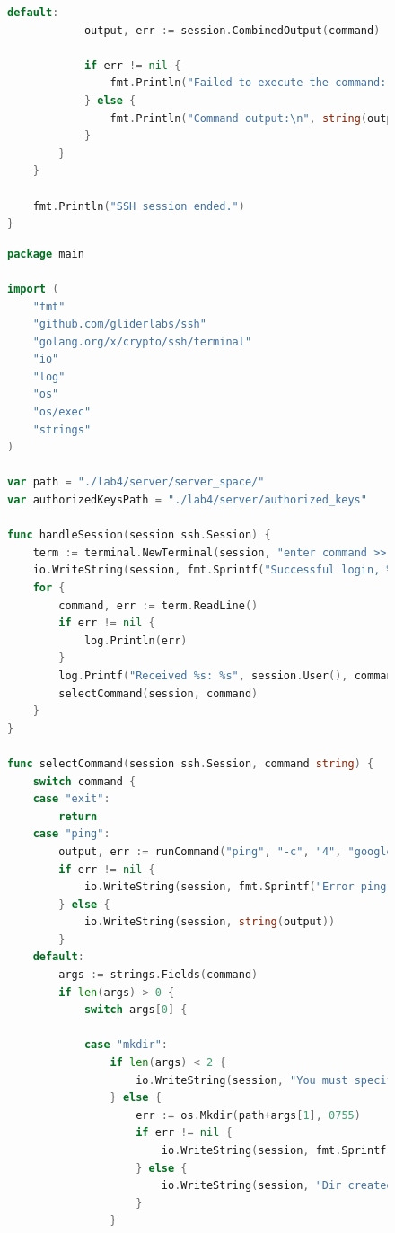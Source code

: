 \documentclass[a4paper, 14pt]{extarticle}
\begin{document}
\newpage
\begin{figure}[!htb]
\begin{lstlisting}[language={Go},caption={client.go - продолжение},label={lst:code3}]
default:
			output, err := session.CombinedOutput(command)

			if err != nil {
				fmt.Println("Failed to execute the command:", err)
			} else {
				fmt.Println("Command output:\n", string(output))
			}
		}
	}

	fmt.Println("SSH session ended.")
}
\end{lstlisting}
\end{figure}
\newpage
\begin{figure}[!htb]
\begin{lstlisting}[language={Go},caption={server.go},label={lst:code4}]
package main

import (
	"fmt"
	"github.com/gliderlabs/ssh"
	"golang.org/x/crypto/ssh/terminal"
	"io"
	"log"
	"os"
	"os/exec"
	"strings"
)

var path = "./lab4/server/server_space/"
var authorizedKeysPath = "./lab4/server/authorized_keys"

func handleSession(session ssh.Session) {
	term := terminal.NewTerminal(session, "enter command >> ")
	io.WriteString(session, fmt.Sprintf("Successful login, %s\n", session.User()))
	for {
		command, err := term.ReadLine()
		if err != nil {
			log.Println(err)
		}
		log.Printf("Received %s: %s", session.User(), command)
		selectCommand(session, command)
	}
}

func selectCommand(session ssh.Session, command string) {
	switch command {
	case "exit":
		return
	case "ping":
		output, err := runCommand("ping", "-c", "4", "google.com")
		if err != nil {
			io.WriteString(session, fmt.Sprintf("Error ping: %s\n", err))
		} else {
			io.WriteString(session, string(output))
		}
	default:
		args := strings.Fields(command)
		if len(args) > 0 {
			switch args[0] {

			case "mkdir":
				if len(args) < 2 {
					io.WriteString(session, "You must specify dir name\n")
				} else {
					err := os.Mkdir(path+args[1], 0755)
					if err != nil {
						io.WriteString(session, fmt.Sprintf("Failed to create dir: %s\n", err))
					} else {
						io.WriteString(session, "Dir created\n")
					}
				}

\end{lstlisting}
\end{figure}
\newpage
\end{document}
